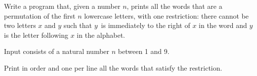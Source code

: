 

\Statement

Write a program that, given a number $n$,
prints all the words
that are a permutation of the first $n$ lowercase letters,
with one restriction:
there cannot be two letters $x$ and $y$
such that $y$~is immediately to the right of $x$ in the word
and $y$ is the letter following $x$ in the alphabet.


\Input

Input consists of a natural number $n$ between 1 and 9.


\Output

Print in order and one per line
all the words that satisfy the restriction.


\Sample

